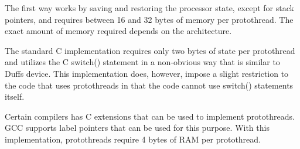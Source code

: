 The first way works by saving and restoring the processor state, except for stack pointers, and requires between 16 and 32 bytes of memory per protothread. The exact amount of memory required depends on the architecture.

The standard C implementation requires only two bytes of state per protothread and utilizes the C switch() statement in a non-\/obvious way that is similar to Duff\textquotesingle{}s device. This implementation does, however, impose a slight restriction to the code that uses protothreads in that the code cannot use switch() statements itself.

Certain compilers has C extensions that can be used to implement protothreads. G\+CC supports label pointers that can be used for this purpose. With this implementation, protothreads require 4 bytes of R\+AM per protothread. 